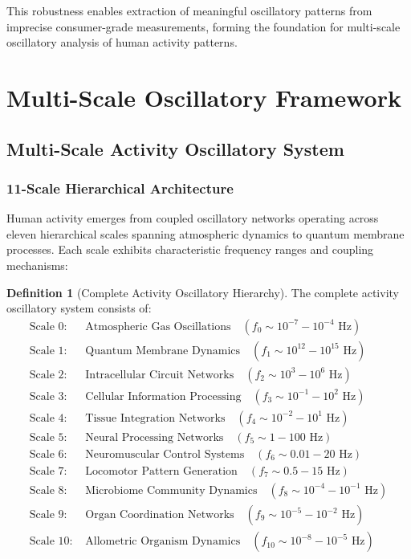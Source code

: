 \documentclass[12pt,a4paper]{article}
\theoremstyle{definition}
\newtheorem{definition}{Definition}[section]
\begin{document}
This robustness enables extraction of meaningful oscillatory patterns from imprecise consumer-grade measurements, forming the foundation for multi-scale oscillatory analysis of human activity patterns.

\section{Multi-Scale Oscillatory Framework}

\subsection{Multi-Scale Activity Oscillatory System}

\subsubsection{11-Scale Hierarchical Architecture}

Human activity emerges from coupled oscillatory networks operating across eleven hierarchical scales spanning atmospheric dynamics to quantum membrane processes. Each scale exhibits characteristic frequency ranges and coupling mechanisms:

\begin{definition}[Complete Activity Oscillatory Hierarchy]
The complete activity oscillatory system consists of:
\begin{align}
\text{Scale 0: } &\text{Atmospheric Gas Oscillations} \quad (f_0 \sim 10^{-7}-10^{-4} \text{ Hz}) \label{eq:atmospheric} \\
\text{Scale 1: } &\text{Quantum Membrane Dynamics} \quad (f_1 \sim 10^{12}-10^{15} \text{ Hz}) \label{eq:quantum} \\
\text{Scale 2: } &\text{Intracellular Circuit Networks} \quad (f_2 \sim 10^{3}-10^{6} \text{ Hz}) \label{eq:intracellular} \\
\text{Scale 3: } &\text{Cellular Information Processing} \quad (f_3 \sim 10^{-1}-10^{2} \text{ Hz}) \label{eq:cellular} \\
\text{Scale 4: } &\text{Tissue Integration Networks} \quad (f_4 \sim 10^{-2}-10^{1} \text{ Hz}) \label{eq:tissue} \\
\text{Scale 5: } &\text{Neural Processing Networks} \quad (f_5 \sim 1-100 \text{ Hz}) \label{eq:neural} \\
\text{Scale 6: } &\text{Neuromuscular Control Systems} \quad (f_6 \sim 0.01-20 \text{ Hz}) \label{eq:neuromuscular} \\
\text{Scale 7: } &\text{Locomotor Pattern Generation} \quad (f_7 \sim 0.5-15 \text{ Hz}) \label{eq:locomotor} \\
\text{Scale 8: } &\text{Microbiome Community Dynamics} \quad (f_8 \sim 10^{-4}-10^{-1} \text{ Hz}) \label{eq:microbiome} \\
\text{Scale 9: } &\text{Organ Coordination Networks} \quad (f_9 \sim 10^{-5}-10^{-2} \text{ Hz}) \label{eq:organ} \\
\text{Scale 10: } &\text{Allometric Organism Dynamics} \quad (f_{10} \sim 10^{-8}-10^{-5} \text{ Hz}) \label{eq:allometric}
\end{align}
\end{definition}
\end{document}
